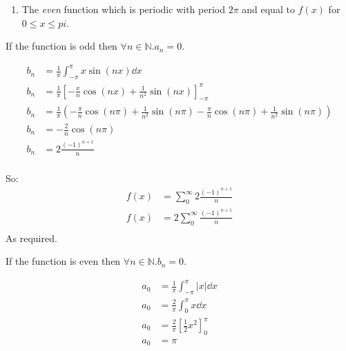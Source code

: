 \documentclass[10pt,\jkfside,a4paper]{article}
\begin{document}
\begin{enumerate}
\begin{enumerate}
\item 

The \textit{even} function which is periodic with period $2\pi$ and equal to $f(x)$ for 
$0 \leq x \leq pi$.

\begin{center}
\end{center}

\end{enumerate}

If the function is odd then $\forall n \in \mathbb{N}. a_n = 0$.

\[
\begin{split}
b_n &= \frac{1}{\pi}\int^\pi_{-\pi}x\sin(nx)\dd{x} \\
b_n &= \frac{1}{\pi}\left[-\frac{x}{n}\cos(nx) + \frac{1}{n^2}\sin(nx) \right]^\pi_{-\pi} \\
b_n &= \frac{1}{\pi}\left(-\frac{\pi}{n}\cos(n\pi) + \frac{1}{n^2}\sin(n\pi) - \frac{\pi}{n}\cos(n\pi) + \frac{1}{n^2}\sin(n\pi) \right) \\
b_n &= -\frac{2}{n}\cos(n\pi) \\
b_n &= 2\frac{(-1)^{n+1}}{n} \\
\end{split}
\]

So:
\[
\begin{split}
f(x) &= \sum^\infty_0 2\frac{(-1)^{n+1}}{n} \\
f(x) &= 2\sum^\infty_0 \frac{(-1)^{n+1}}{n} \\
\end{split}
\]
As required.

If the function is even then $\forall n \in \mathbb{N}. b_n = 0$.

\[
\begin{split}
a_0 &= \frac{1}{\pi}\int^\pi_{-\pi} |x| \dd{x} \\
a_0 &= \frac{2}{\pi}\int^\pi_0 x \dd{x} \\
a_0 &= \frac{2}{\pi}\left[\frac{1}{2}x^2 \right]^\pi_0 \\
a_0 &= \pi \\
\end{split}
\]


\end{enumerate}
\end{document}
